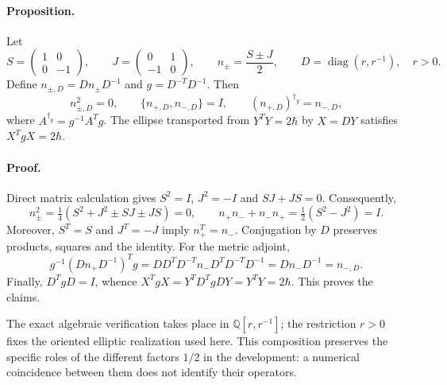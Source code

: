 \paragraph{Proposition.}
Let
\begin{equation}
 S=\begin{pmatrix}1&0\\0&-1\end{pmatrix},\qquad
 J=\begin{pmatrix}0&1\\-1&0\end{pmatrix},\qquad
 n_\pm=\frac{S\pm J}{2},\qquad
 D=\operatorname{diag}(r,r^{-1}),\quad r>0.
 \label{md:compos:bloque-nilpotente}
\end{equation}
Define $n_{\pm,D}=Dn_\pm D^{-1}$ and $g=D^{-T}D^{-1}$. Then
\begin{equation}
 n_{\pm,D}^2=0,\qquad
 \{n_{+,D},n_{-,D}\}=I,\qquad
 (n_{+,D})^{\dagger_g}=n_{-,D},
 \label{md:compos:identidades-nilpotentes}
\end{equation}
where $A^{\dagger_g}=g^{-1}A^Tg$. The ellipse transported from
$Y^TY=2\hbar$ by $X=DY$ satisfies $X^TgX=2\hbar$.

\paragraph{Proof.}
Direct matrix calculation gives
$S^2=I$, $J^2=-I$ and $SJ+JS=0$. Consequently,
\[
 n_\pm^2=\tfrac14(S^2+J^2\pm SJ\pm JS)=0,
 \qquad
 n_+n_-+n_-n_+=\tfrac12(S^2-J^2)=I.
\]
Moreover, $S^T=S$ and $J^T=-J$ imply $n_+^T=n_-$. Conjugation by $D$
preserves products, squares and the identity. For the metric adjoint,
\[
 g^{-1}(Dn_+D^{-1})^Tg
 =DD^T D^{-T}n_-D^T D^{-T}D^{-1}
 =Dn_-D^{-1}=n_{-,D}.
\]
Finally, $D^TgD=I$, whence
$X^TgX=Y^TD^TgDY=Y^TY=2\hbar$. This proves the claims.

The exact algebraic verification takes place in
$\mathbb Q[r,r^{-1}]$; the restriction $r>0$ fixes the oriented elliptic
realization used here. This composition preserves the specific roles of the
different factors $1/2$ in the development: a numerical coincidence between
them does not identify their operators.
